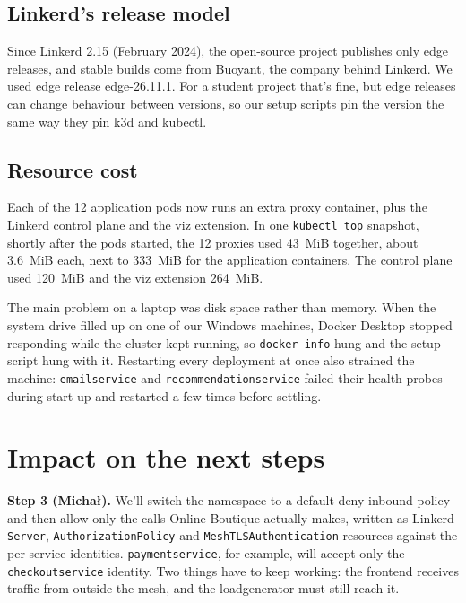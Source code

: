 \documentclass[12pt,a4paper]{article}
\begin{document}
\subsection*{Linkerd's release model}

Since Linkerd 2.15 (February 2024), the open-source project publishes only
edge releases, and stable builds come from Buoyant, the company behind
Linkerd. We used edge release edge-26.11.1. For a student project that's fine,
but edge releases can change behaviour between versions, so our setup scripts
pin the version the same way they pin k3d and kubectl.

\subsection*{Resource cost}

Each of the 12 application pods now runs an extra proxy container, plus the
Linkerd control plane and the viz extension. In one \texttt{kubectl top}
snapshot, shortly after the pods started, the 12 proxies used 43~MiB together,
about 3.6~MiB each, next to 333~MiB for the application containers. The control
plane used 120~MiB and the viz extension 264~MiB.

The main problem on a laptop was disk space rather than memory. When the system
drive filled up on one of our Windows machines, Docker Desktop stopped
responding while the cluster kept running, so \texttt{docker info} hung and the
setup script hung with it. Restarting every deployment at once also strained
the machine: \texttt{emailservice} and \texttt{recommendationservice} failed
their health probes during start-up and restarted a few times before settling.

\section{Impact on the next steps}

\textbf{Step 3 (Michał).} We'll switch the namespace to a default-deny
inbound policy and then allow only the calls Online Boutique actually makes,
written as Linkerd \texttt{Server}, \texttt{AuthorizationPolicy} and
\texttt{MeshTLSAuthentication} resources against the per-service identities.
\texttt{paymentservice}, for example, will accept only the
\texttt{checkoutservice} identity. Two things have to keep working: the
frontend receives traffic from outside the mesh, and the loadgenerator must
still reach it.
\end{document}
